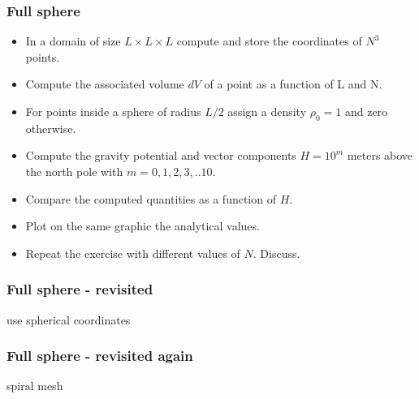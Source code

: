 
\subsubsection{Full sphere}

\begin{itemize}
\item In a domain of size $L\times L \times L$ compute and store the coordinates 
of $N^3$ points.
\item Compute the associated volume $dV$ of a point as a function of L and N.
\item For points inside a sphere of radius $L/2$ assign a density $\rho_0=1$ and zero otherwise.
\item Compute the gravity potential and vector components $H=10^m$ meters above the north pole 
with $m=0,1,2,3,..10$. 
\item Compare the computed quantities as a function of $H$.
\item Plot on the same graphic the analytical values. 
\item Repeat the exercise with different values of $N$. Discuss.
\end{itemize}


\subsubsection{Full sphere - revisited}

use spherical coordinates

\subsubsection{Full sphere - revisited again}

spiral mesh
